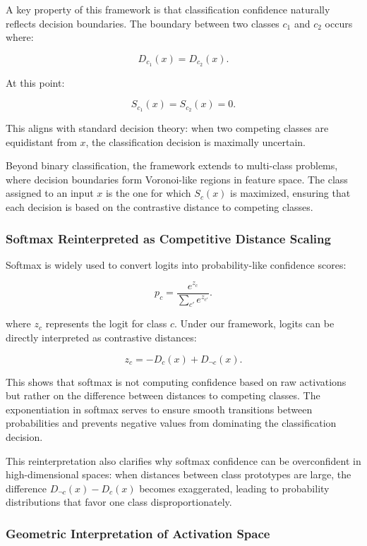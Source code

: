 \documentclass[12pt]{article}
\begin{document}
A key property of this framework is that classification confidence naturally reflects decision boundaries. The boundary between two classes \( c_1 \) and \( c_2 \) occurs where:

\[
D_{c_1}(x) = D_{c_2}(x).
\]

At this point:

\[
S_{c_1}(x) = S_{c_2}(x) = 0.
\]

This aligns with standard decision theory: when two competing classes are equidistant from \( x \), the classification decision is maximally uncertain.

Beyond binary classification, the framework extends to multi-class problems, where decision boundaries form Voronoi-like regions in feature space. The class assigned to an input \( x \) is the one for which \( S_c(x) \) is maximized, ensuring that each decision is based on the contrastive distance to competing classes.

\subsubsection{Softmax Reinterpreted as Competitive Distance Scaling}

Softmax is widely used to convert logits into probability-like confidence scores:

\[
p_c = \frac{e^{z_c}}{\sum_{c'} e^{z_{c'}}}.
\]

where \( z_c \) represents the logit for class \( c \). Under our framework, logits can be directly interpreted as contrastive distances:

\[
z_c = -D_c(x) + D_{\neg c}(x).
\]

This shows that softmax is not computing confidence based on raw activations but rather on the difference between distances to competing classes. The exponentiation in softmax serves to ensure smooth transitions between probabilities and prevents negative values from dominating the classification decision.

This reinterpretation also clarifies why softmax confidence can be overconfident in high-dimensional spaces: when distances between class prototypes are large, the difference \( D_{\neg c}(x) - D_c(x) \) becomes exaggerated, leading to probability distributions that favor one class disproportionately.

\subsubsection{Geometric Interpretation of Activation Space}
\end{document}
